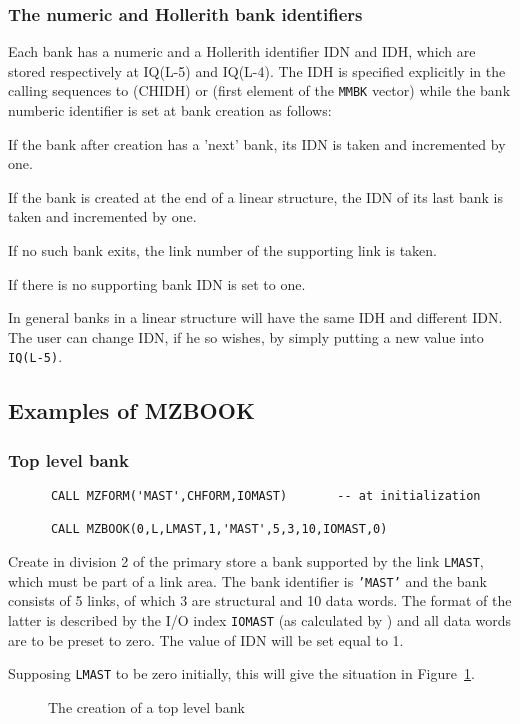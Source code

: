\subsubsection{The numeric and Hollerith bank identifiers}
\par Each bank has a numeric and a Hollerith
identifier IDN and IDH, which are stored respectively
at IQ(L-5) and IQ(L-4). The IDH is specified explicitly
in the calling sequences to  (CHIDH) or  (first
element of the {\tt MMBK} vector) while the bank numberic identifier
is set at bank creation as follows:
\begin{UL}
\item If the bank after creation has a 'next' bank, its IDN is taken
and incremented by one.
\item If the bank is created at the end of a linear structure, the IDN
of its last bank is taken and incremented by one.
\item If no such bank exits, the link number
of the supporting link is taken.
\item If there is no supporting bank IDN is set to one.
\end{UL}
In general banks in a linear structure will have the same IDH
and different IDN. The user can change IDN,
if he so wishes, by simply putting a new value into {\tt IQ(L-5)}.
\subsection{Examples of MZBOOK}
\subsubsection{Top level bank}
\begin{verbatim}
      CALL MZFORM('MAST',CHFORM,IOMAST)       -- at initialization
 
      CALL MZBOOK(0,L,LMAST,1,'MAST',5,3,10,IOMAST,0)
\end{verbatim}
\par Create in division 2 of the primary store
a bank supported by the link {\tt LMAST}, which must be part of a
link area. The bank identifier is {\tt 'MAST'} and the bank
consists of 5 links, of
which 3 are structural and 10 data words. The format of
the latter is described by the I/O index {\tt IOMAST} (as calculated
by ) and all data words are to be preset to zero.
The value of IDN will be set equal to 1.
\par Supposing {\tt LMAST}
to be zero initially, this will give the situation in
Figure~\ref{MZBOOK1}.
\begin{figure}
\caption{The creation of a top level bank}
\label{MZBOOK1}
\end{figure}
